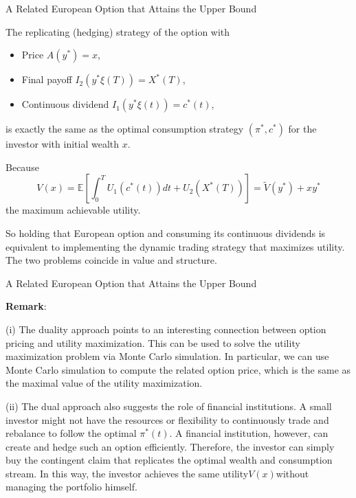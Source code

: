 \documentclass{beamer}
\begin{document}
\begin{frame}{A Related European Option that Attains the Upper Bound}

    {\footnotesize \footnotesize
    The replicating (hedging) strategy of the option with

\begin{itemize}
    \item Price \( A(y^*) = x \),
    \item Final payoff \( I_2(y^*\xi(T)) = X^*(T) \),
    \item Continuous dividend \( I_1(y^*\xi(t)) = c^*(t) \),
\end{itemize}

is exactly the same as the optimal consumption strategy \( (\pi^*,c^*) \) for the investor with initial wealth \( x \).
\vspace{1em}
\par  \pause Because 
\[
V(x) = \mathbb{E}\left[ \int_{0}^{T} U_1(c^*(t))dt + U_2(X^*(T)) \right] = \tilde{V}(y^*) + xy^*
\]
the maximum achievable utility.

So holding that European option and consuming its continuous dividends is equivalent to implementing the dynamic trading strategy that maximizes utility.  
The two problems coincide in value and structure.
    }
\end{frame}

\begin{frame}{A Related European Option that Attains the Upper Bound}

    {\footnotesize \footnotesize
    \textbf{Remark}: 
    \par (i) The duality approach points to an interesting connection
    between option pricing and utility maximization. This can be used to solve the
    utility maximization problem via Monte Carlo simulation. In particular, we can
    use Monte Carlo simulation to compute the related option price, which is the
    same as the maximal value of the utility maximization.
    \vspace{1em}
    \par  \pause (ii) The dual approach also suggests the role of financial institutions.
    A small investor might not have the resources or flexibility to continuously trade and rebalance to follow the optimal $\pi^*(t)$.
    A financial institution, however, can create and hedge such an option efficiently.
     Therefore, the investor can simply buy the contingent claim that replicates the optimal wealth and consumption stream. 
     In this way, the investor achieves the same utility$ V(x) $without managing the portfolio himself.
    }
\end{frame}



    
\end{document}
